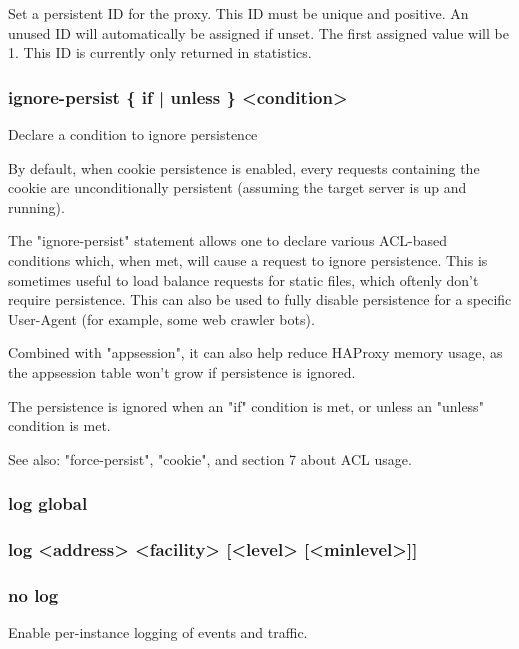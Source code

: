   Set a persistent ID for the proxy. This ID must be unique and positive.
  An unused ID will automatically be assigned if unset. The first assigned
  value will be 1. This ID is currently only returned in statistics.

\subsubsection[ignore-persist]{ignore-persist \{ if | unless \} <condition>}
  Declare a condition to ignore persistence


  By default, when cookie persistence is enabled, every requests containing
  the cookie are unconditionally persistent (assuming the target server is up
  and running).

  The "ignore-persist" statement allows one to declare various ACL-based
  conditions which, when met, will cause a request to ignore persistence.
  This is sometimes useful to load balance requests for static files, which
  oftenly don't require persistence. This can also be used to fully disable
  persistence for a specific User-Agent (for example, some web crawler bots).

  Combined with "appsession", it can also help reduce HAProxy memory usage, as
  the appsession table won't grow if persistence is ignored.

  The persistence is ignored when an "if" condition is met, or unless an
  "unless" condition is met.

  See also: "force-persist", "cookie", and section 7 about ACL usage.

\subsubsection[log global]{log global}
\subsubsection[log]{log <address> <facility> [<level> [<minlevel>]]}
\subsubsection[no log]{no log}


  Enable per-instance logging of events and traffic.
  

